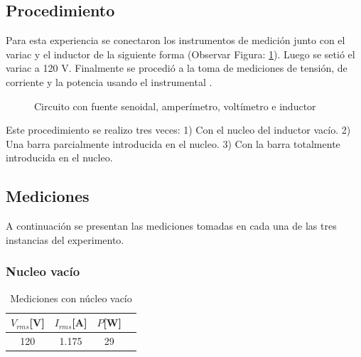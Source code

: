 \documentclass{article}
\begin{document}
    \subsection{Procedimiento}

        Para esta experiencia se conectaron los instrumentos de medición junto con el variac y el inductor de la siguiente forma (Observar Figura: \ref{fig:circuito-inductor}). Luego se setió el variac a 120 V. Finalmente se procedió a la toma de mediciones de tensión, de corriente y la potencia usando el instrumental . 
        \begin{figure}[h!]
            \centering
            \caption{Circuito con fuente senoidal, amperímetro, voltímetro e inductor}
            \label{fig:circuito-inductor}
        \end{figure}

        Este procedimiento se realizo tres veces: 1) Con el nucleo del inductor vacío. 2) Una barra parcialmente introducida en el nucleo. 3) Con la barra totalmente introducida en el nucleo.

    \subsection{Mediciones}
        
        A continuación se presentan las mediciones tomadas en cada una de las tres instancias del experimento.

        \subsubsection{Nucleo vacío}

        \begin{table}[H]
            \centering
            \begin{tabular}{|c|c|c|c|}
                \hline
                $V_{rms} $[V] & $I_{rms} $[A] & $P $[W]  \\ \hline
                120           & 1.175         & 29     \\ \hline
            \end{tabular}
            \caption{Mediciones con núcleo vacío}
            \label{tab:mediciones-nucleo-vacio}
        \end{table}
\end{document}

